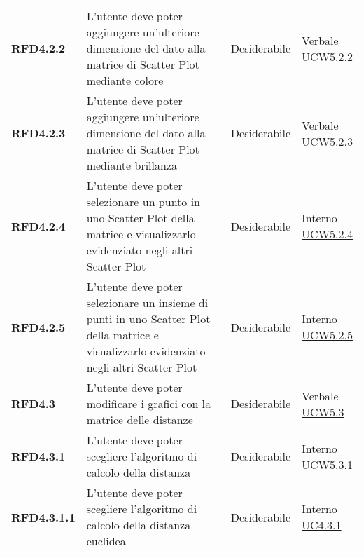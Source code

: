 \begin{longtable}[H]{| >{\raggedright\bfseries}m{20mm} | >{\raggedright}m{90mm} | >{\centering}m{25mm} | >{\centering\arraybackslash}m{30mm}|}
    RFD4.2.2
     & L'utente deve poter aggiungere un'ulteriore dimensione del dato alla matrice di Scatter Plot mediante colore
     & Desiderabile
     & \makecell{ Verbale                                                                                                \\ \hyperref[par:ucw5.2.2]{UCW5.2.2} }\\

    RFD4.2.3
     & L'utente deve poter aggiungere un'ulteriore dimensione del dato alla matrice di Scatter Plot mediante brillanza
     & Desiderabile
     & \makecell{ Verbale                                                                                                \\ \hyperref[par:ucw5.2.3]{UCW5.2.3} }\\

    RFD4.2.4
     & L'utente deve poter selezionare un punto in uno Scatter Plot della matrice e visualizzarlo evidenziato negli
    altri Scatter Plot
     & Desiderabile
     & \makecell{ Interno                                                                                                \\ \hyperref[par:ucw5.2.4]{UCW5.2.4} }\\

    RFD4.2.5
     & L'utente deve poter selezionare un insieme di punti in uno Scatter Plot della matrice e visualizzarlo evidenziato
    negli altri Scatter Plot
     & Desiderabile
     & \makecell{ Interno                                                                                                \\ \hyperref[par:ucw5.2.5]{UCW5.2.5} }\\

    RFD4.3
     & L'utente deve poter modificare i grafici con la matrice delle distanze
     & Desiderabile
     & \makecell{ Verbale                                                                                                \\ \hyperref[ssub:ucw5.3]{UCW5.3} }\\

    RFD4.3.1
     & L'utente deve poter scegliere l'algoritmo di calcolo della distanza
     & Desiderabile
     & \makecell{ Interno                                                                                                \\ \hyperref[par:ucw5.3.1]{UCW5.3.1} }\\

    RFD4.3.1.1
     & L'utente deve poter scegliere l'algoritmo di calcolo della distanza euclidea
     & Desiderabile
     & \makecell{ Interno                                                                                                \\ \hyperref[par:uc4.3.1]{UC4.3.1} }\\


\end{longtable}
